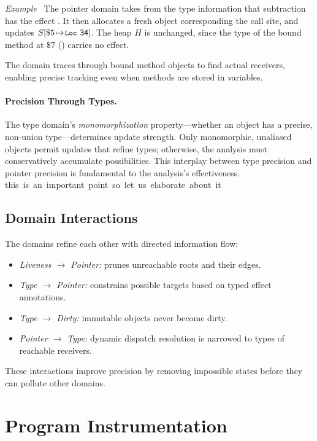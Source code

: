 \smallskip
\textit{Example~%
%
\theexample}
%
The pointer domain takes from the type information that subtraction has the effect \tnew. It then allocates a fresh object  corresponding the call site, and updates $S[\$5{\hspace{1pt}\mapsto\hspace{1pt}}\textsf{\texttt{\small Loc}~{34}}]$. The heap $H$ is unchanged, since the type of the bound method at $\$7$ () carries no \tupdate effect.
%

The domain traces through bound method objects to find actual receivers, enabling precise tracking even when methods are stored in variables.

\paragraph{Precision Through Types.}
The type domain's \emph{monomorphization} property---whether an object has a precise, non-union type---determines update strength. Only monomorphic, unaliased objects permit updates that refine types; otherwise, the analysis must conservatively accumulate possibilities. This interplay between type precision and pointer precision is fundamental to the analysis's effectiveness.
\si{this is an important point so let us elaborate about it}

\subsection{Domain Interactions}
The domains refine each other with directed information flow:
\begin{itemize}
    \item \emph{Liveness $\rightarrow$ Pointer:} prunes unreachable roots and their edges.
    \item \emph{Type $\rightarrow$ Pointer:} constrains possible targets based on typed effect annotations.
    \item \emph{Type $\rightarrow$ Dirty:} immutable objects never become dirty.
    \item \emph{Pointer $\rightarrow$ Type:} dynamic dispatch resolution is narrowed to types of reachable receivers.
\end{itemize}
These interactions improve precision by removing impossible states before they can pollute other domains.



\section{Program Instrumentation}
\label{sec:min-persist}

